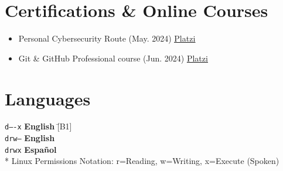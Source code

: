 \documentclass[11pt,a4paper,sans]{moderncv}
\newcommand{\sectionMargin}{-3mm}
\begin{document}
\section{Certifications \& Online Courses}{
\begin{itemize}[label=\textbullet, noitemsep]
    \item Personal Cybersecurity Route (May. 2024) \href{https://1drv.ms/b/c/13c8ae619d64655e/EZYaMe6SBhJAshtvq4ORCQoBwWMYRerI4_xiuqXjORVd0w?e=I4tLqg}{\underline{Platzi}}
    \item Git \& GitHub Professional course (Jun. 2024) \href{https://1drv.ms/b/c/13c8ae619d64655e/EXeQGPrTCjFDpmx8pCItVTwB-OS1r-tkKJbmgYnahuxtYg?e=akKEsU}{\underline{Platzi}}
\end{itemize}
}

\vspace*{\sectionMargin}
\section{Languages}
\begin{tabbing}
  \texttt{d----x} \hspace{1mm}\= \textbf{English} \hspace{1mm}\= [B1] \\
  \texttt{drw--} \> \textbf{English} \> [Technical] \\
  \texttt{drwx} \> \textbf{Español} \> [Native] \\
  \** Linux Permissions Notation: r=Reading, w=Writing, x=Execute (Spoken)
\end{tabbing}
\end{document}
